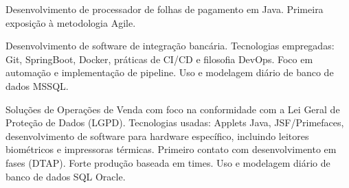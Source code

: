 \documentclass[10pt,a4paper,ragged2e]{altacv}
\begin{document}

\begin{fullwidth}
\makecvheader
\end{fullwidth}



Desenvolvimento de processador de folhas de pagamento em Java. Primeira exposição à metodologia Agile.

\divider

Desenvolvimento de software de integração bancária. Tecnologias empregadas: Git, SpringBoot, Docker, práticas de CI/CD e filosofia DevOps. Foco em automação e implementação de pipeline. Uso e modelagem diário de banco de dados MSSQL.

\divider

Soluções de Operações de Venda com foco na conformidade com a Lei Geral de Proteção de Dados (LGPD). Tecnologias usadas: Applets Java, JSF/Primefaces, desenvolvimento de software para hardware específico, incluindo leitores biométricos e impressoras térmicas. Primeiro contato com desenvolvimento em fases (DTAP). Forte produção baseada em times. Uso e modelagem diário de banco de dados SQL Oracle.
\end{document}
